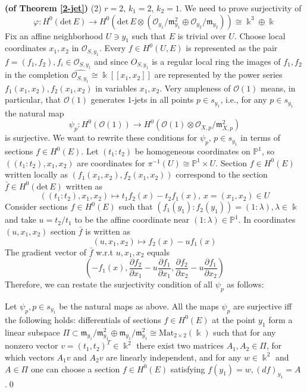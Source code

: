 \documentclass[10pt,a4paper]{amsart}
\renewenvironment{proof}[1]{\par\medskip\noindent\textbf{#1}\enspace\ignorespaces}{\par\medskip}
\begin{document}
\begin{proof}{(of Theorem \ref{2-jet})}
    (2) $r=2$, $k_1=2$, $k_2=1$. We need to prove surjectivity of
    \[
    \varphi \colon H^0(\mathrm{det}\, E) \to H^0(\mathrm{det} \,E \otimes (\mathcal O_{y_1}/\mathfrak m_{y_1}^2\oplus \mathcal O_{y_2} / \mathfrak m_{y_2})) \cong \Bbbk^3\oplus \Bbbk
    \]
    Fix an affine neighborhood $U \ni y_1$ such that $E$ is trivial over $U$. Choose local coordinates $x_1, x_2$ in $\mathcal O_{S, y_1}$.
    Every $f\in H^0(U, E)$ is represented as the pair $f = (f_1, f_2), f_i \in \mathcal O_{S,y_1}$ and since $O_{S,y_1}$ is a regular local ring the images of $f_1, f_2$ in the completion $\widehat{\mathcal O_{S, y_1}} \cong \Bbbk[[x_1, x_2]]$ are represented by the power series $f_1(x_1, x_2), f_2(x_1, x_2)$ in variables $x_1, x_2$.
    Very ampleness of $\mathcal O(1)$ means, in particular, that $\mathcal O(1)$ generates $1$-jets in all points $p \in s_{y_1}$, i.e., for any $p \in s_{y_1}$ the natural map
    \[
    \psi_p \colon H^0(\mathcal O(1)) \to H^0(\mathcal O(1) \otimes \mathcal O_{X, p}/ \mathfrak m_{X, p}^2)
    \]
    is surjective.
    We want to rewrite these conditions for $\psi_p,\, p \in s_{y_1}$ in terms of sections $f\in H^0(E)$.
    Let $(t_1 \colon t_2)$ be homogeneous coordinates on $\mathbb P^1$, so $((t_1 \colon t_2), x_1, x_2)$ are coordinates for $\pi^{-1}(U) \cong \mathbb P^1 \times U$.
    Section $f\in H^0(E)$ written locally as $(f_1(x_1, x_2), f_2(x_1, x_2))$ correspond to the section $\bar f\in H^0(\mathrm{det}\, E)$ written as
    \[
    ((t_1:t_2), x_1, x_2) \mapsto t_1 f_2(x) - t_2 f_1(x),\, x = (x_1, x_2) \in U
    \]
    Consider sections $f \in H^0(E)$ such that $(f_1(y_1)\colon f_2(y_1)) = (1:\lambda), \lambda \in \Bbbk$ and take $u = t_2/t_1$ to be the affine coordinate near $(1:\lambda) \in \mathbb P^1$.
    In coordinates $(u, x_1, x_2)$ section $\bar f$ is written as
    \[
    (u, x_1, x_2) \mapsto f_2(x)-uf_1(x)
    \]
    The gradient vector of $\bar f$ w.r.t $u, x_1, x_2$ equals
    \[
    \left(-f_1(x), \frac{\partial f_2}{\partial x_1} - u\frac{\partial f_1}{\partial x_1}, \frac{\partial f_2}{\partial x_2} - u\frac{\partial f_1}{\partial x_2}\right)
    \]
    Therefore, we can restate the surjectivity condition of all $\psi_p$ as follows:
    \begin{prop}
        \label{matrices}
        Let $\psi_p, p \in s_{y_1}$ be the natural maps as above.
        All the maps $\psi_p$ are surjective iff the following holds: differentials of sections $f\in H^0(E)$ at the point $y_1$ form a linear subspace $\Pi\subset \mathfrak m_{y_1}/\mathfrak m_{y_1}^2 \oplus \mathfrak m_{y_1}/\mathfrak m_{y_1}^2 \cong \mathrm{Mat}_{2 \times 2}(\Bbbk)$
        such that for any nonzero vector $v = (t_1, t_2)^T \in \Bbbk^2$ there exist two matrices $A_1, A_2 \in \Pi$, for which vectors $A_1 v$ and $A_2 v$ are linearly independent,
        and for any $w \in \Bbbk^2$ and $A\in \Pi$ one can choose a section $f \in H^0(E)$ satisfying $f(y_1) = w, (df)_{y_1} = A$.\qed
    \end{prop}
    

\end{proof}
\end{document}
